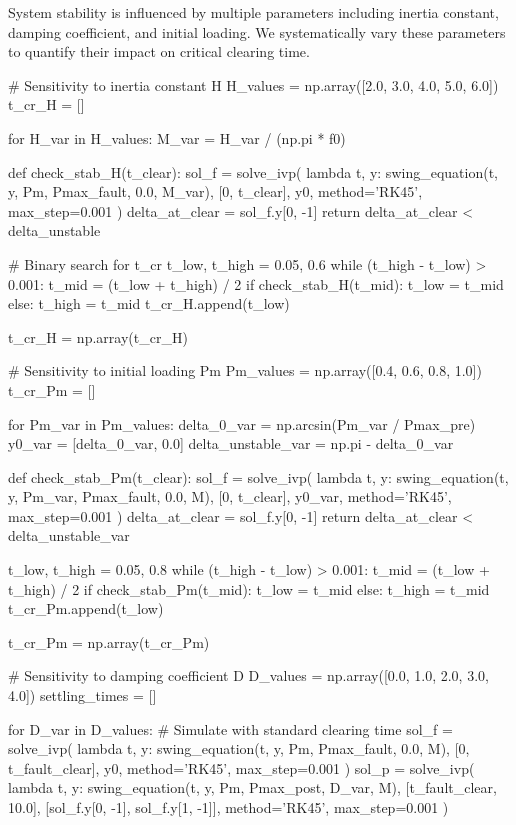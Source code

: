 \documentclass[11pt,a4paper]{article}
\begin{document}
System stability is influenced by multiple parameters including inertia constant, damping coefficient, and initial loading. We systematically vary these parameters to quantify their impact on critical clearing time.

\begin{pycode}
# Sensitivity to inertia constant H
H_values = np.array([2.0, 3.0, 4.0, 5.0, 6.0])
t_cr_H = []

for H_var in H_values:
    M_var = H_var / (np.pi * f0)

    def check_stab_H(t_clear):
        sol_f = solve_ivp(
            lambda t, y: swing_equation(t, y, Pm, Pmax_fault, 0.0, M_var),
            [0, t_clear], y0, method='RK45', max_step=0.001
        )
        delta_at_clear = sol_f.y[0, -1]
        return delta_at_clear < delta_unstable

    # Binary search for t_cr
    t_low, t_high = 0.05, 0.6
    while (t_high - t_low) > 0.001:
        t_mid = (t_low + t_high) / 2
        if check_stab_H(t_mid):
            t_low = t_mid
        else:
            t_high = t_mid
    t_cr_H.append(t_low)

t_cr_H = np.array(t_cr_H)

# Sensitivity to initial loading Pm
Pm_values = np.array([0.4, 0.6, 0.8, 1.0])
t_cr_Pm = []

for Pm_var in Pm_values:
    delta_0_var = np.arcsin(Pm_var / Pmax_pre)
    y0_var = [delta_0_var, 0.0]
    delta_unstable_var = np.pi - delta_0_var

    def check_stab_Pm(t_clear):
        sol_f = solve_ivp(
            lambda t, y: swing_equation(t, y, Pm_var, Pmax_fault, 0.0, M),
            [0, t_clear], y0_var, method='RK45', max_step=0.001
        )
        delta_at_clear = sol_f.y[0, -1]
        return delta_at_clear < delta_unstable_var

    t_low, t_high = 0.05, 0.8
    while (t_high - t_low) > 0.001:
        t_mid = (t_low + t_high) / 2
        if check_stab_Pm(t_mid):
            t_low = t_mid
        else:
            t_high = t_mid
    t_cr_Pm.append(t_low)

t_cr_Pm = np.array(t_cr_Pm)

# Sensitivity to damping coefficient D
D_values = np.array([0.0, 1.0, 2.0, 3.0, 4.0])
settling_times = []

for D_var in D_values:
    # Simulate with standard clearing time
    sol_f = solve_ivp(
        lambda t, y: swing_equation(t, y, Pm, Pmax_fault, 0.0, M),
        [0, t_fault_clear], y0, method='RK45', max_step=0.001
    )
    sol_p = solve_ivp(
        lambda t, y: swing_equation(t, y, Pm, Pmax_post, D_var, M),
        [t_fault_clear, 10.0], [sol_f.y[0, -1], sol_f.y[1, -1]],
        method='RK45', max_step=0.001
    )


\end{pycode}
\end{document}
